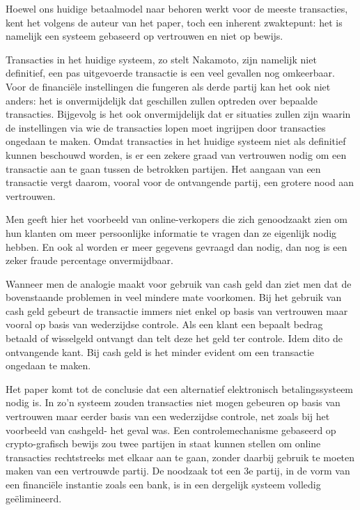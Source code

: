 			Hoewel ons huidige betaalmodel naar behoren werkt voor de meeste transacties, kent het volgens de auteur van het paper, toch een inherent zwaktepunt: het is namelijk een systeem gebaseerd op vertrouwen en niet op bewijs.
			
			Transacties in het huidige systeem, zo stelt Nakamoto, zijn namelijk niet definitief, een pas uitgevoerde transactie is een veel gevallen nog omkeerbaar. Voor de financiële instellingen die fungeren als derde partij kan het ook niet anders: het is onvermijdelijk dat geschillen zullen optreden over bepaalde transacties. Bijgevolg is het ook onvermijdelijk dat er situaties zullen zijn waarin de instellingen via wie de transacties lopen moet ingrijpen door transacties ongedaan te maken. Omdat transacties in het huidige systeem niet als definitief kunnen beschouwd worden, is er een zekere graad van vertrouwen nodig om een transactie aan te gaan tussen de betrokken partijen.  Het aangaan van een transactie vergt daarom, vooral voor de ontvangende partij, een grotere nood aan vertrouwen. 
			
			Men geeft hier het voorbeeld van online-verkopers die zich genoodzaakt zien om hun klanten om meer persoonlijke informatie te vragen dan ze eigenlijk nodig hebben. En ook al worden er meer gegevens gevraagd dan nodig, dan nog is een zeker fraude percentage onvermijdbaar. 
		
			Wanneer men de analogie maakt voor gebruik van cash geld dan ziet men dat de bovenstaande problemen in veel mindere mate voorkomen. Bij het gebruik van cash geld gebeurt de transactie immers niet enkel op basis van vertrouwen maar vooral op basis van wederzijdse controle. Als een klant een bepaalt bedrag betaald of wisselgeld ontvangt dan telt deze het geld ter controle. Idem dito de ontvangende kant. Bij cash geld is het minder evident om een transactie ongedaan te maken. 
			
			Het paper komt tot de conclusie dat een alternatief elektronisch betalingssysteem nodig is. In zo’n systeem zouden transacties niet mogen gebeuren op basis van vertrouwen maar eerder basis van een wederzijdse controle, net zoals bij het voorbeeld van cashgeld- het geval was. Een controlemechanisme gebaseerd op crypto-grafisch bewijs zou twee partijen in staat kunnen stellen om online transacties rechtstreeks met elkaar aan te gaan, zonder daarbij gebruik te moeten maken van een vertrouwde partij. De noodzaak tot een 3e partij, in de vorm van een financiële instantie zoals een bank, is in een dergelijk systeem volledig geëlimineerd.
		
